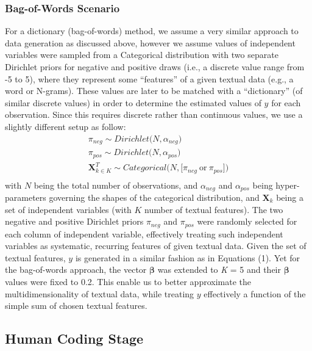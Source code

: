 \documentclass[man, floatsintext, 12pt, a4paper, noextraspace]{apa6}
\begin{document}
    \subsubsection{Bag-of-Words Scenario}
     For a dictionary (bag-of-words) method, we assume a very similar approach to data generation as discussed above, however we assume values of independent variables were sampled from a Categorical distribution with two separate Dirichlet priors for negative and positive draws (i.e., a discrete value range from -5 to 5), where they represent some \enquote{features} of a given textual data (e.g., a word or N-grams). These values are later to be matched with a \enquote{dictionary} (of similar discrete values) in order to determine the estimated values of $y$ for each observation. Since this requires discrete rather than continuous values, we use a slightly different setup as follow:
       \begin{equation}
        \begin{gathered}
            \pi_{neg} \sim Dirichlet\bigl(N, \alpha_{neg}\bigr) \\
            \pi_{pos} \sim Dirichlet\bigl(N, \alpha_{pos}\bigr) \\
            \boldsymbol{X}_{k \in K}^T \sim Categorical\bigl(N, \bigl[\pi_{neg}\ \textrm{or}\ \pi_{pos}\bigr]\bigr) \\
        \end{gathered}
    \end{equation}
    \noindent with $N$ being the total number of observations, and $\alpha_{neg}$ and $\alpha_{pos}$ being hyper-parameters governing the shapes of the categorical distribution, and $\boldsymbol{X}_k$ being a set of independent variables (with $K$ number of textual features). The two negative and positive Dirichlet priors $\pi_{neg}$ and $\pi_{pos}$ were randomly selected for each column of independent variable, effectively treating such independent variables as systematic, recurring features of given textual data. Given the set of textual features, $y$ is generated in a similar fashion as in Equations (1). Yet for the bag-of-words approach, the vector $\boldsymbol{\beta}$ was extended to \textit{K} = 5 and their $\boldsymbol{\beta}$ values were fixed to 0.2. This enable us to better approximate the multidimensionality of textual data, while treating $y$ effectively a function of the simple sum of chosen textual features. 

    \subsection{Human Coding Stage}
    
\end{document}
